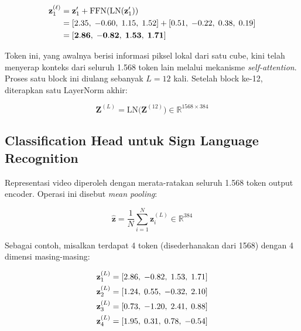 \vspace{0.5cm}
\begin{align*}
  \mathbf{z}_1^{(\ell)}
  &= \mathbf{z}'_1 + \mathrm{FFN}(\mathrm{LN}(\mathbf{z}'_1)) \notag \\
  &= [2.35,\; -0.60,\; 1.15,\; 1.52]
   + [0.51,\; -0.22,\; 0.38,\; 0.19] \notag \\
  &= [\mathbf{2.86},\; \mathbf{-0.82},\; \mathbf{1.53},\; \mathbf{1.71}]
\end{align*}
\vspace{0.5cm}
 
\noindent
Token ini, yang awalnya berisi informasi piksel lokal dari satu cube,
kini telah menyerap konteks dari seluruh 1.568 token lain melalui
mekanisme \textit{self-attention}. Proses satu block ini diulang
sebanyak $L=12$ kali. Setelah block ke-12, diterapkan satu LayerNorm
akhir:
 
\vspace{0.5cm}
\begin{equation}
  \mathbf{Z}^{(L)} = \mathrm{LN}\!\bigl(\mathbf{Z}^{(12)}\bigr)
  \in\mathbb{R}^{1568\times384}
\end{equation}
\vspace{0.5cm}
 
 
\subsection{Classification Head untuk Sign Language Recognition}
 
Representasi video diperoleh dengan merata-ratakan seluruh 1.568
token output encoder. Operasi ini disebut \textit{mean pooling}:
 
\vspace{0.5cm}
\begin{equation}
  \hat{\mathbf{z}}
  = \frac{1}{N}\sum_{i=1}^{N}\mathbf{z}_i^{(L)}
  \in\mathbb{R}^{384}
\end{equation}
\vspace{0.5cm}
 
\noindent
Sebagai contoh, misalkan terdapat 4 token (disederhanakan dari 1568)
dengan 4 dimensi masing-masing:
 
\vspace{0.5cm}
\begin{align*}
  \mathbf{z}_1^{(L)} &= [2.86,\; -0.82,\; 1.53,\; 1.71] \notag \\
  \mathbf{z}_2^{(L)} &= [1.24,\; 0.55,\; -0.32,\; 2.10] \notag \\
  \mathbf{z}_3^{(L)} &= [0.73,\; -1.20,\; 2.41,\; 0.88] \notag \\
  \mathbf{z}_4^{(L)} &= [1.95,\; 0.31,\; 0.78,\; -0.54]
\end{align*}
\vspace{0.5cm}
 
